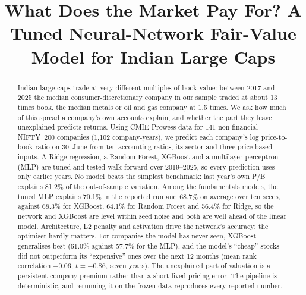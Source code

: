 \documentclass[conference]{IEEEtran}
\begin{document}
\title{What Does the Market Pay For? A Tuned Neural-Network Fair-Value Model for Indian Large Caps}

\author{
}

\maketitle

\begin{abstract}
Indian large caps trade at very different multiples of book value: between 2017 and 2025 the median consumer-discretionary company in our sample traded at about 13 times book, the median metals or oil and gas company at 1.5 times. We ask how much of this spread a company's own accounts explain, and whether the part they leave unexplained predicts returns. Using CMIE Prowess data for 141 non-financial NIFTY~200 companies (1,102 company-years), we predict each company's log price-to-book ratio on 30~June from ten accounting ratios, its sector and three price-based inputs. A Ridge regression, a Random Forest, XGBoost and a multilayer perceptron (MLP) are tuned and tested walk-forward over 2019--2025, so every prediction uses only earlier years. No model beats the simplest benchmark: last year's own P/B explains 81.2\% of the out-of-sample variation. Among the fundamentals models, the tuned MLP explains 70.1\% in the reported run and 68.7\% on average over ten seeds, against 68.3\% for XGBoost, 64.1\% for Random Forest and 56.4\% for Ridge, so the network and XGBoost are level within seed noise and both are well ahead of the linear model. Architecture, L2 penalty and activation drive the network's accuracy; the optimiser hardly matters. For companies the model has never seen, XGBoost generalises best (61.0\% against 57.7\% for the MLP), and the model's ``cheap'' stocks did not outperform its ``expensive'' ones over the next 12 months (mean rank correlation $-0.06$, $t=-0.86$, seven years). The unexplained part of valuation is a persistent company premium rather than a short-lived pricing error. The pipeline is deterministic, and rerunning it on the frozen data reproduces every reported number.
\end{abstract}
\end{document}
